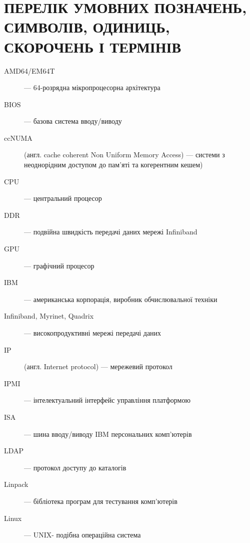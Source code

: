 \chapter{ПЕРЕЛІК УМОВНИХ ПОЗНАЧЕНЬ, СИМВОЛІВ, ОДИНИЦЬ, СКОРОЧЕНЬ І ТЕРМІНІВ}

\begin{description}
\item[AMD64/EM64T] --- 64-розрядна мікропроцесорна архітектура
\item[BIOS] --- базова система вводу/виводу
\item [ccNUMA] (англ. cache coherent Non Uniform Memory Access) --- системи з неоднорідним доступом до пам'яті та когерентним кешем)
\item[CPU] --- центральний процесор
\item[DDR] --- подвійна швидкість передачі даних мережі Infiniband
\item[GPU] --- графічний процесор
\item[IBM] --- американська корпорація, виробник обчислювальної техніки
\item[Infiniband, Myrinet, Quadrix] --- високопродуктивні мережі передачі даних
\item[IP] (англ. Internet protocol) --- мережевий протокол
\item[IPMI] --- інтелектуальний інтерфейс управління платформою
\item[ISA] --- шина вводу/виводу IBM персональних комп'ютерів
\item[LDAP] --- протокол доступу до каталогів
\item[Linpack] --- бібліотека програм для тестування комп'ютерів
\item[Linux] --- UNIX- подібна операційна система

\end{description}
